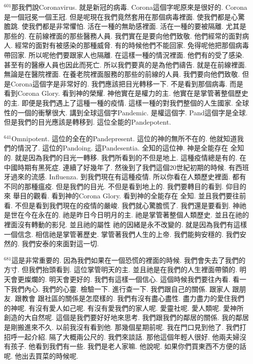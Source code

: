 \documentclass{book}
\begin{document}
$^{601}$那我們說Coronavirus.
就是新冠的病毒.
Corona這個字呢原來是很好的.
Corona是一個冠冕一個王冠.
但是呢現在我們竟然套用在那個病毒裡面.
使我們都是心驚膽跳.
使我們都是非常懼怕.
活在一種的無助感裡面.
活在一種的要被隔離.
尤其是那些的.
在前線裡面的那些醫務人員.
我們實在是要向他們致敬.
他們經常的面對病人.
經常的面對有被感染的那種威脅.
有的時候他們不能回家.
免得呢他把那個病毒帶回家.
所以呢他們要跟家人也隔離.
在這樣一種的情況裡面.
他們有的受了感染.
甚至有的醫療人員也因此而死亡.
所以我們要真的是為他們禱告.
就是在前線裡面.
無論是在醫院裡面.
在養老院裡面服務的那些的前線的人員.
我們要向他們致敬.
但是Corona這個字是非常好的.
我們應該把目光轉移一下.
不是看到那個病毒.
而是看到Corona Glory.
看到神的榮耀.
神他實在是權力的主.
他實在是掌管著整個歷史的主.
即便是我們遇上了這種一種的疫情.
這樣一種的對我們整個的人生國家.
全球性的一個的衝擊很大.
講到全球這個字Pandemic.
是權這個字.
Pand這個字是全球.
但是我們的目光應該是轉移到.
這位全能的Pandepotent.

$^{641}$Omnipotent.
這位的全在的Pandepresent.
這位的神的無所不在的.
他就知道我們的情況了.
這位的Pandoing.
這Pandesentia.
全知的這位神.
神是全能存在 全知的.
就是因為我們的目光一轉移.
我們所看到的不但是地上.
這種疫情總是有的.
在中國時期有黑死症.
連續了好幾年了.
然後到了我們這個20世紀初期的時候.
有西班牙過來的流感.
Influenza.
到我們現在有這種疫情.
所以你看在人類歷史裡面.
都有不同的那種瘟疫.
但是我們的目光.
不但是看到地上的.
我們要轉目的看到.
仰目的來 舉目的觀看.
看到神的Corona Glory.
看到神的全能存在 全知.
並且我們要往前看.
不但是看到我們現在的疫情的嚴峻.
我們就心驚膽慌了.
我們還是要看到.
神祂是世在今在永在的.
祂是昨日今日明月的主.
祂是掌管著整個人類歷史.
並且在祂的裡面沒有轉動的影兒.
並且祂的屬性 祂的因緒是永不改變的.
就是因為我們有這樣一個信念.
相信祂是掌管著歷史.
掌管著我們人生的上帝.
我們能夠安穩的.
我們安然的.
我們安泰的來面對這一切.

$^{681}$這是非常重要的.
因為我們如果在一個恐慌的裡面的時候.
我們會失去了我們的方寸.
但我們抬頭看到.
這位掌管明天的主.
並且祂是在我們的人生裡面帶領的.
明天會更燦爛的.
明天會更好的.
我們有這樣一個信心.
這個時候我們要往內看.
看一下我們內心.
我們的心靈.
檢驗一下.
進行查一下.
我們跟自己的關係.
跟家人 跟朋友.
跟教會 跟社區的關係是怎麼樣的.
我們有沒有盡心盡性.
盡力盡力的愛住我們的神呢.
有沒有愛人如己呢.
有沒有愛我們的家人呢.
愛靈社呢.
愛人類呢.
愛神所創造的大自然呢.
這個是我們要好好地來思考.
我們跟我們的鄰居的關係.
我的鄰居是剛搬進來不久.
以前我沒有看到他.
那幾個星期前呢.
我在門口見到他了.
我們打招呼一起介紹.
隔了大概兩公尺的.
我們來談話.
那他這個年輕人很好.
他兩夫婦沒有孩子.
他看到我們有一些.
我們是老人家嘛.
他說呢.
如果你們買東西不方便的話呢.
他出去買菜的時候呢.
\end{document}
